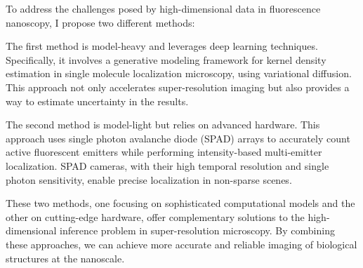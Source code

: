 To address the challenges posed by high-dimensional data in fluorescence nanoscopy, I propose two different methods:

The first method is model-heavy and leverages deep learning techniques. Specifically, it involves a generative modeling framework for kernel density estimation in single molecule localization microscopy, using variational diffusion. This approach not only accelerates super-resolution imaging but also provides a way to estimate uncertainty in the results.

The second method is model-light but relies on advanced hardware. This approach uses single photon avalanche diode (SPAD) arrays to accurately count active fluorescent emitters while performing intensity-based multi-emitter localization. SPAD cameras, with their high temporal resolution and single photon sensitivity, enable precise localization in non-sparse scenes.

These two methods, one focusing on sophisticated computational models and the other on cutting-edge hardware, offer complementary solutions to the high-dimensional inference problem in super-resolution microscopy. By combining these approaches, we can achieve more accurate and reliable imaging of biological structures at the nanoscale.

